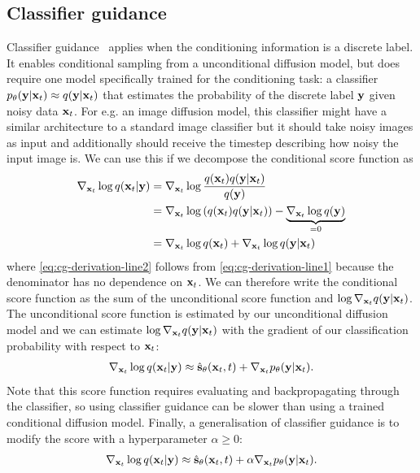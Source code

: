 \subsection{Classifier guidance}
Classifier guidance~\citep{song2020score} applies when the conditioning information is a discrete label. It enables conditional sampling from a unconditional diffusion model, but does require one model specifically trained for the conditioning task: a classifier $p_\theta({\mathbf{y}}|{\mathbf{x}}_t) \approx q({\mathbf{y}}|{\mathbf{x}}_t)$ that estimates the probability of the discrete label ${\mathbf{y}}$ given noisy data ${\mathbf{x}}_t$. For e.g. an image diffusion model, this classifier might have a similar architecture to a standard image classifier but it should take noisy images as input and additionally should receive the timestep describing how noisy the input image is. We can use this if we decompose the conditional score function as
\begin{align}
    \nabla_{{\mathbf{x}}_t} \log q({\mathbf{x}}_t|{\mathbf{y}}) &= \nabla_{{\mathbf{x}}_t} \log \frac{q({\mathbf{x}}_t)q({\mathbf{y}}|{\mathbf{x}}_t)}{q({\mathbf{y}})} \label{eq:cg-derivation-line1} \\
    &= \nabla_{{\mathbf{x}}_t} \log \left( q({\mathbf{x}}_t) q({\mathbf{y}}|{\mathbf{x}}_t) \right) - \underbrace{\nabla_{{\mathbf{x}}_t} \log q({\mathbf{y}})}_{=0}  \label{eq:cg-derivation-line2} \\
    &= \nabla_{{\mathbf{x}}_t} \log q({\mathbf{x}}_t) + \nabla_{{\mathbf{x}}_t} \log q({\mathbf{y}}|{\mathbf{x}}_t)  \label{eq:cg-derivation-line3}
\end{align}
where \cref{eq:cg-derivation-line2} follows from \cref{eq:cg-derivation-line1} because the denominator has no dependence on ${\mathbf{x}}_t$. We can therefore write the conditional score function as the sum of the unconditional score function and $\log \nabla_{{\mathbf{x}}_t} q({\mathbf{y}}|{\mathbf{x}}_t)$. The unconditional score function is estimated by our unconditional diffusion model and we can estimate $\log \nabla_{{\mathbf{x}}_t} q({\mathbf{y}}|{\mathbf{x}}_t)$ with the gradient of our classification probability with respect to ${\mathbf{x}}_t$:
\begin{align}
    \nabla_{{\mathbf{x}}_t} \log q({\mathbf{x}}_t|{\mathbf{y}}) \approx \hat{{\mathbf{s}}}_\theta({\mathbf{x}}_t, t) + \nabla_{{\mathbf{x}}_t} p_\theta({\mathbf{y}}|{\mathbf{x}}_t).
\end{align}
Note that this score function requires evaluating and backpropagating through the classifier, so using classifier guidance can be slower than using a trained conditional diffusion model. Finally, a generalisation of classifier guidance is to modify the score with a hyperparameter $\alpha \geq 0$:
\begin{align}
    \nabla_{{\mathbf{x}}_t} \log q({\mathbf{x}}_t|{\mathbf{y}}) \approx \hat{{\mathbf{s}}}_\theta({\mathbf{x}}_t, t) + \alpha \nabla_{{\mathbf{x}}_t} p_\theta({\mathbf{y}}|{\mathbf{x}}_t). \label{eq:cg-score-function}
\end{align}
